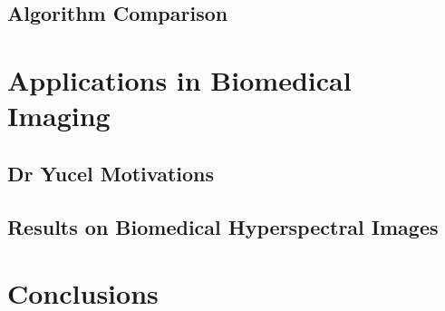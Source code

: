 \documentclass[10pt]{article}
\begin{document}
\clearpage
\subsection{Algorithm Comparison}

\clearpage
% 
% 
% 
% 
% 
\section{Applications in Biomedical Imaging}

\subsection{Dr Yucel Motivations}
\subsection{Results on Biomedical Hyperspectral Images}

\clearpage
% 
% 
% 
% 
% 
\section{Conclusions}
\end{document}
